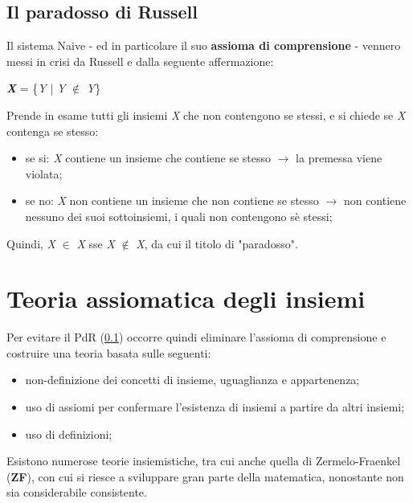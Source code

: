 \documentclass[12pt]{article}
\begin{document}
\subsection{Il paradosso di Russell} \label{subsec:Russell}
Il sistema Naive - ed in particolare il suo \textbf{assioma di comprensione} - vennero messi in crisi da Russell e dalla seguente affermazione:
\begin{center}
    \textbf{\textit{X}} = \{\textit{Y} | \textit{Y} $\notin$ \textit{Y}\}
\end{center}
Prende in esame tutti gli insiemi \textit{X} che non contengono se stessi, e si chiede se \textit{X} contenga se stesso:
\begin{itemize}
    \item se si: \textit{X} contiene un insieme che contiene se stesso $\rightarrow$ la premessa viene violata;
    \item se no: \textit{X} non contiene un insieme che non contiene se stesso $\rightarrow$ non contiene nessuno dei suoi sottoinsiemi, i quali non contengono sè stessi;
\end{itemize}
Quindi, \textit{X} $\in$ \textit{X} sse \textit{X} $\notin$ \textit{X}, da cui il titolo di "paradosso".
\section{Teoria assiomatica degli insiemi}
Per evitare il PdR (\ref{subsec:Russell}) occorre quindi eliminare l'assioma di comprensione e costruire una teoria basata sulle seguenti:
\begin{itemize}
    \item non-definizione dei concetti di insieme, uguaglianza e appartenenza;
    \item uso di assiomi per confermare l'esistenza di insiemi a partire da altri insiemi;
    \item uso di definizioni;
\end{itemize}
Esistono numerose teorie insiemistiche, tra cui anche quella di Zermelo-Fraenkel (\textbf{ZF}), con cui si riesce a sviluppare gran parte della matematica, nonostante non sia considerabile consistente.
\end{document}
